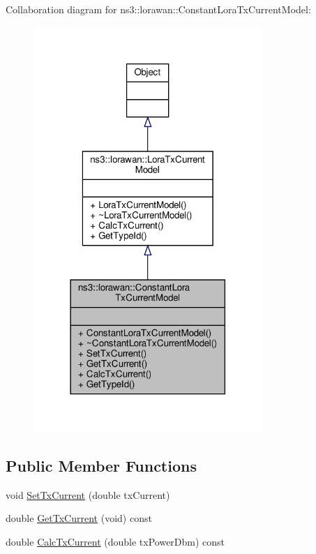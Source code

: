 Collaboration diagram for ns3\+:\+:lorawan\+:\+:Constant\+Lora\+Tx\+Current\+Model\+:
\nopagebreak
\begin{figure}[H]
\begin{center}
\leavevmode
\includegraphics[width=246pt]{classns3_1_1lorawan_1_1ConstantLoraTxCurrentModel__coll__graph}
\end{center}
\end{figure}
\subsection*{Public Member Functions}
\begin{DoxyCompactItemize}
\item 
void \hyperlink{classns3_1_1lorawan_1_1ConstantLoraTxCurrentModel_a3c1a59240065eb000df03cbd34b020da}{Set\+Tx\+Current} (double tx\+Current)
\item 
double \hyperlink{classns3_1_1lorawan_1_1ConstantLoraTxCurrentModel_a0c26b75e61ba7f9c4c6773a2e9741215}{Get\+Tx\+Current} (void) const
\item 
double \hyperlink{classns3_1_1lorawan_1_1ConstantLoraTxCurrentModel_afd0b31a415eae9f95dd4464612925dad}{Calc\+Tx\+Current} (double tx\+Power\+Dbm) const
\end{DoxyCompactItemize}

